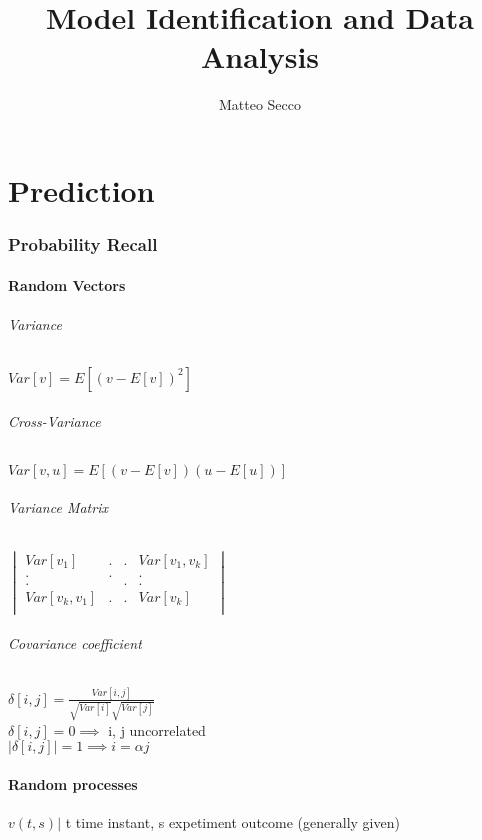 \documentclass{article}
\title{Model Identification and Data Analysis}
\author{Matteo Secco}
\begin{document}
\maketitle
\newpage
\tableofcontents
\newpage

\part{Prediction}
\section{Probability Recall}

\subsection{Random Vectors}

\paragraph{Variance}
$Var[v]=E[(v-E[v])^2]$
\paragraph{Cross-Variance}
$Var[v,u]=E[(v-E[v])(u-E[u])]$
\paragraph{Variance Matrix}
$\begin{vmatrix}
	Var[v_1]			&	.	&	.	&	Var[v_1,v_k]		\\
		.			&	.	&		&		.			\\
		.			&		&	.	&		.			\\
	Var[v_k,v_1]		&	.	&	.	&	Var[v_k]			\\
				
\end{vmatrix}$
\paragraph{Covariance coefficient}
	$\delta[i,j]=\frac{Var[i,j]}{\sqrt{Var[i]}\sqrt{Var[j]}}$\\
	$\delta[i,j]=0 \implies$ i, j uncorrelated\\
	$\left|\delta[i,j]\right|=1 \implies i=\alpha j$
	
\subsection{Random processes} $v(t,s) |$ t time instant, s expetiment outcome (generally given)
\end{document}
